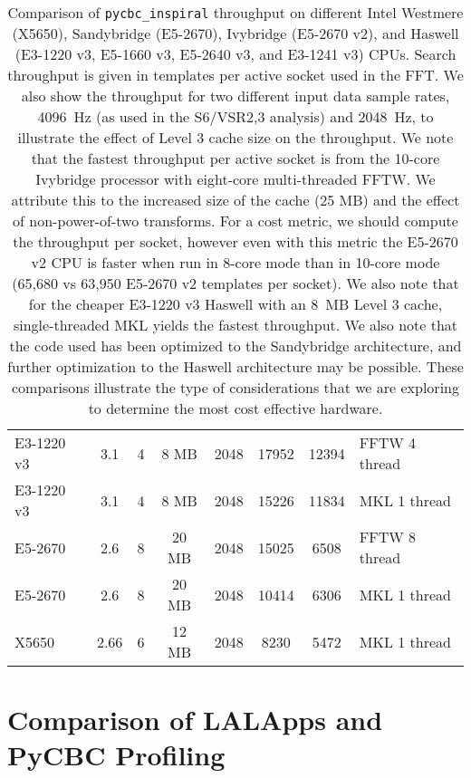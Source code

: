\begin{table}[!t]
\begin{center}
{\begin{tabular}{|l|c|c|c|c|c|c|l|}
E3-1220 v3  & 3.1 & 4          & 8 MB          & 2048          & 17952 & 12394 & FFTW 4 thread      \\
E3-1220 v3  & 3.1 & 4          & 8 MB          & 2048          & 15226 & 11834 & MKL 1 thread       \\
E5-2670     & 2.6 & 8          & 20 MB         & 2048          & 15025 &  6508 & FFTW 8 thread      \\
E5-2670     & 2.6 & 8          & 20 MB         & 2048          & 10414 &  6306 & MKL 1 thread       \\
X5650       & 2.66 & 6          & 12 MB         & 2048          &  8230 &  5472 & MKL 1 thread       \\\hline
\end{tabular}  
}
\caption{%
\label{tab:cpu-trade-study}
Comparison of \texttt{pycbc\_inspiral} throughput on different Intel Westmere
(X5650), Sandybridge (E5-2670), Ivybridge (E5-2670 v2), and Haswell (E3-1220 v3,
E5-1660 v3, E5-2640 v3, and E3-1241 v3)
CPUs. Search throughput is given in templates per active socket used in the
FFT. We also show the throughput for two different input data sample rates,
4096~Hz (as used in the S6/VSR2,3 analysis) and 2048~Hz, to illustrate the
effect of Level 3 cache size on the throughput. We note that the fastest
throughput per active socket is from the 10-core Ivybridge processor with 
eight-core multi-threaded FFTW. We attribute this to the increased size of the
cache (25 MB) and the effect of non-power-of-two transforms. For a cost
metric, we should compute the throughput per socket, however even with this
metric the E5-2670 v2 CPU is faster when run in 8-core mode than in 10-core
mode (65,680 vs 63,950 E5-2670 v2 templates per socket). We also note that for
the cheaper E3-1220 v3 Haswell with an 8~MB Level 3 cache, single-threaded MKL yields the fastest throughput. 
 We also note that the code used has been optimized to the Sandybridge
architecture, and further optimization to the Haswell architecture may be
possible.
These comparisons illustrate the type of
considerations that we are exploring to determine the most cost effective
hardware.
}
\end{center}
\end{table}

\vspace*{-10pt}
\section{Comparison of LALApps and PyCBC Profiling}
\vspace*{-05pt}
\label{a:lalapps}

